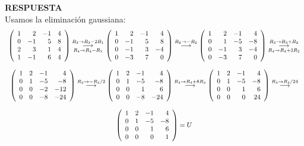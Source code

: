 \documentclass[11pt,letterpaper]{article}
\newcommand{\res}{\textbf{RESPUESTA}\\}
\newcommand{\grstep}[2][\relax]{%
   \ensuremath{\mathrel{
       {\mathop{\longrightarrow}\limits^{#2\mathstrut}_{
                                     \begin{subarray}{l} #1 \end{subarray}}}}}}
\begin{document}
\begin{enumerate}
\res Usamos la eliminación gaussiana:
\begin{equation*}
\begin{array}{c}
\left(
\begin{array}{rrrr}
 1 &  2 & -1 & 4\\
 0 & -1 &  5 & 8\\
 2 &  3 &  1 & 4\\
 1 & -1 &  6 & 4
\end{array}
\right)%
\grstep[R_4 \rightarrow R_4-R_1]{R_3 \rightarrow R_3-2R_1}
%
\left(
\begin{array}{rrrr}
 1 &  2 & -1 &  4\\
 0 & -1 &  5 &  8\\
 0 & -1 &  3 & -4\\
 0 & -3 &  7 &  0
\end{array}
\right)%
\grstep[]{R_2 \rightarrow -R_2}
%
\left(
\begin{array}{rrrr}
 1 &  2 & -1 &  4\\
 0 &  1 & -5 & -8\\
 0 & -1 &  3 & -4\\
 0 & -3 &  7 &  0
\end{array}
\right)%
\grstep[R_4 \rightarrow R_4+3R_2]{R_3 \rightarrow R_3+R_2}\\
\\
\left(
\begin{array}{rrrr}
 1 &  2 & -1 &   4\\
 0 &  1 & -5 &  -8\\
 0 &  0 & -2 & -12\\
 0 &  0 & -8 & -24
\end{array}
\right)%
\grstep[]{R_3 \rightarrow -R_3/2}
%
\left(
\begin{array}{rrrr}
 1 &  2 & -1 &   4\\
 0 &  1 & -5 &  -8\\
 0 &  0 &  1 &   6\\
 0 &  0 & -8 & -24
\end{array}
\right)%
\grstep[]{R_4 \rightarrow R_4+8R_3}
%
\left(
\begin{array}{rrrr}
 1 &  2 & -1 &   4\\
 0 &  1 & -5 &  -8\\
 0 &  0 &  1 &   6\\
 0 &  0 &  0 &  24
\end{array}
\right)%
\grstep[]{R_4 \rightarrow R_4/24}
\\
\\
\left(
\begin{array}{rrrr}
 1 &  2 & -1 &   4\\
 0 &  1 & -5 &  -8\\
 0 &  0 &  1 &   6\\
 0 &  0 &  0 &  1
\end{array}
\right)= U
\end{array} 
\end{equation*}



\end{enumerate}
\end{document}
